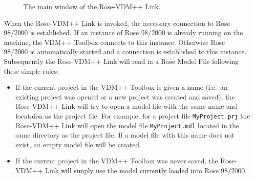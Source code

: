 \documentclass[\pformat,12pt]{article}
\newcommand{\vdmpp}{VDM++}
\newcommand{\ToolboxName}{\vdmpp{} Toolbox}
\newcommand{\link}{Rose-\vdmpp{} Link}
\newcommand{\rose}{Rose 98/2000}
\begin{document}
\begin{figure}[htb]
\begin{center}
\mbox{}
\caption{The main window of the \link{}.\label{fig:userinterface}}
\end{center}
\end{figure}

When the \link{} is invoked, the necessary connection to \rose{} is
established. If an instance of \rose{} is already running on the
machine, the \vdmpp{} Toolbox connects to this instance. Otherwise
\rose{} is automatically started and a connection is established to
this instance. Subsequently the \link{} will read in a Rose Model File
following these simple rules:
\begin{itemize}
\item If the current project in the \ToolboxName{} is given a name
  (i.e.\ an existing project was opened or a new project was created
  and saved), the \link{} will try to open a model file with the same
  name and locataion as the project file. For example, for a project
  file {\tt MyProject.prj} the \link{} will open the model file
  {\tt MyProject.mdl} located in the same directory as the project file.
  If a model file with this name does not exist, an empty model file
  will be created.
\item If the current project in the \ToolboxName{} was never saved,
  the \link{} will simply use the model currently loaded into
  \rose{}.
\end{itemize}
\end{document}
